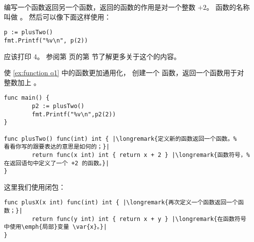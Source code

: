\begin{Exercise}[title={函数返回一个函数},difficulty=6]
\label{ex:function}
\Question\label{ex:function q1} 编写一个函数返回另一个函数，返回的函数的作用是对一个整数 $+2$。
函数的名称叫做 。
然后可以像下面这样使用：
\begin{lstlisting}
p := plusTwo()
fmt.Printf("%v\n", p(2))
\end{lstlisting}
应该打印 4。
参阅第 \pageref{sec:callbacks} 页的第  节了解更多关于这个的内容。

\Question\label{ex:function q2} 使 \ref{ex:function q1} 中的函数更加通用化，
创建一个  函数，返回一个函数用于对整数加上 。
\end{Exercise}

\begin{Answer}
\Question
\begin{lstlisting}
func main() {
        p2 := plusTwo()
        fmt.Printf("%v\n",p2(2))
}

func plusTwo() func(int) int { |\longremark{定义新的函数返回一个函数。%
看看你写的跟要表达的意思是如何的；}|
        return func(x int) int { return x + 2 } |\longremark{函数符号，%
在返回语句中定义了一个 +2 的函数。}|
}
\end{lstlisting}
\showremarks

\Question
这里我们使用闭包：
\begin{lstlisting}
func plusX(x int) func(int) int { |\longremark{再次定义一个函数返回一个函数；}|
        return func(y int) int { return x + y } |\longremark{在函数符号中使用\emph{局部}变量 \var{x}。}|
}
\end{lstlisting}
\showremarks
\end{Answer}
